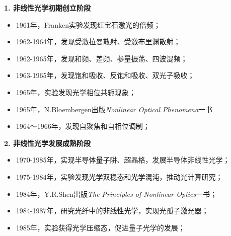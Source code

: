 \documentclass{beamer}
\newenvironment{slide}{
    \begin{frame}{\bfseries{\sectiontitle}}
}{
    \end{frame}
}
\begin{document}
\begin{slide}
    \textbf{1. 非线性光学初期创立阶段}
    \footnotesize{
    \begin{itemize}
        \item 1961年，Franken实验发现红宝石激光的倍频；

        \item 1962-1964年，发现受激拉曼散射、受激布里渊散射；

        \item 1962-1965年，发现和频、差频、参量振荡、四波混频；

        \item 1963-1965年，发现饱和吸收、反饱和吸收、双光子吸收；

        \item 1965年，实验发现光学相位共轭现象；

        \item 1965年，N.Bloembergen出版\textit{Nonlinear Optical Phenomena}一书

        \item 1964～1966年，发现自聚焦和自相位调制；
    \end{itemize}
    }
\end{slide}

\begin{slide}
    \textbf{2. 非线性光学发展成熟阶段}
    \footnotesize{
    \begin{itemize}
        \item 1970-1985年，实现半导体量子阱、超晶格，发展半导体非线性光学；

        \item 1975-1984年，实验发现光学双稳态和光学混沌，推动光计算研究；

        \item 1984年，Y.R.Shen出版\textit{The Principles of Nonlinear Optics}一书；

        \item 1984-1987年，研究光纤中的非线性光学，实现光孤子激光器；

        \item 1985年，实验获得光学压缩态，促进量子光学的发展；
    \end{itemize}
    }
\end{slide}
\end{document}
